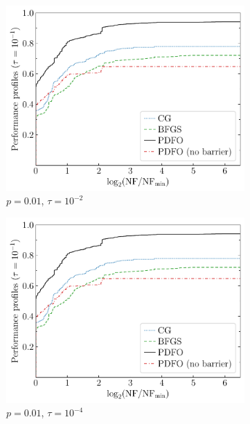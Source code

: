 \documentclass[manuscript,screen,review]{acmart}
\numberwithin{equation}{section}
\begin{document}
\begin{figure}[htbp]
    \begin{subfigure}{.48\textwidth}
        \centering
        \includegraphics[width=\textwidth,page=2]{perf-nan-bfgs_cg_pdfo-50-10-0.01.pdf}
        \caption{$p = 0.01$, $\tau = 10^{-2}$}
    \end{subfigure}
    \hfill
    \begin{subfigure}{.48\textwidth}
        \centering
        \includegraphics[width=\textwidth,page=4]{perf-nan-bfgs_cg_pdfo-50-10-0.01.pdf}
        \caption{$p = 0.01$, $\tau = 10^{-4}$}
    \end{subfigure}
    \hfill
    \begin{subfigure}{.48\textwidth}

\end{subfigure}
\end{figure}
\end{document}
